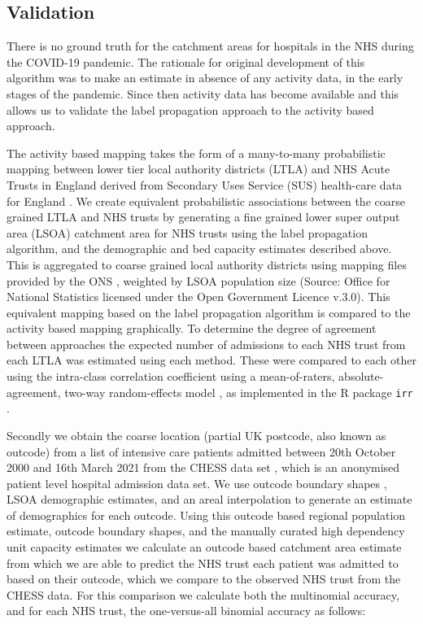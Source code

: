 \documentclass[twocolumn]{bmcart}%
\begin{document}
\subsection*{Validation}

There is no ground truth for the catchment areas for hospitals in the NHS during the COVID-19 pandemic. The rationale 
for original development of this algorithm was to make an estimate in absence of any activity data, in the early stages 
of the pandemic. Since then activity data has become available and this allows us to validate the label propagation 
approach to the activity based approach.

The activity based mapping takes the form of a many-to-many probabilistic mapping between lower tier local authority 
districts (LTLA) and NHS Acute Trusts in England derived from Secondary Uses Service (SUS) health-care data for England 
\cite{meakinNHSTrustLevel2021}. We create equivalent probabilistic associations between the coarse grained LTLA and NHS 
trusts by generating a fine grained lower super output area (LSOA) catchment area for NHS trusts using the label 
propagation algorithm, and the demographic and bed capacity estimates described above. This is aggregated to coarse 
grained local authority districts using mapping files provided by the ONS 
\cite{officeofnationalstatisticsLowerLayerSuper}, weighted by LSOA population size \cite{PopulationEstimatesOffice} 
(Source: Office for National Statistics licensed under the Open Government Licence v.3.0). This equivalent mapping 
based on the label propagation algorithm is compared to the activity based mapping graphically. To determine the degree 
of agreement between approaches the expected number of admissions to each NHS trust from each LTLA was estimated using 
each method. These were compared to each other using the intra-class correlation coefficient 
\cite{bartkoIntraclassCorrelationCoefficient1966,fisherStatisticalMethodsResearch1992} using a mean-of-raters, 
absolute-agreement, two-way random-effects model \cite{kooGuidelineSelectingReporting2016}, as implemented in the R 
package \texttt{irr} \cite{gamer2012package}. 

Secondly we obtain the coarse location (partial UK postcode, also known as outcode) from a list of intensive care 
patients admitted between 20th October 2000 and 16th March 2021 from the CHESS data set \cite{SGSSCHESSData}, which is 
an anonymised patient level hospital admission data set. We use outcode boundary shapes \cite{OpenDoorLogistics}, LSOA 
demographic estimates, and an areal interpolation \cite{prenerArealArealWeighted2020} to generate an estimate of 
demographics for each outcode. Using this outcode based regional population estimate, outcode boundary shapes, and the 
manually curated high dependency unit capacity estimates we calculate an outcode based catchment area estimate from 
which we are able to predict the NHS trust each patient was admitted to based on their outcode, which we compare to the 
observed NHS trust from the CHESS data. For this comparison we calculate both the multinomial accuracy, and for each 
NHS trust, the one-versus-all binomial accuracy as follows:
\end{document}
